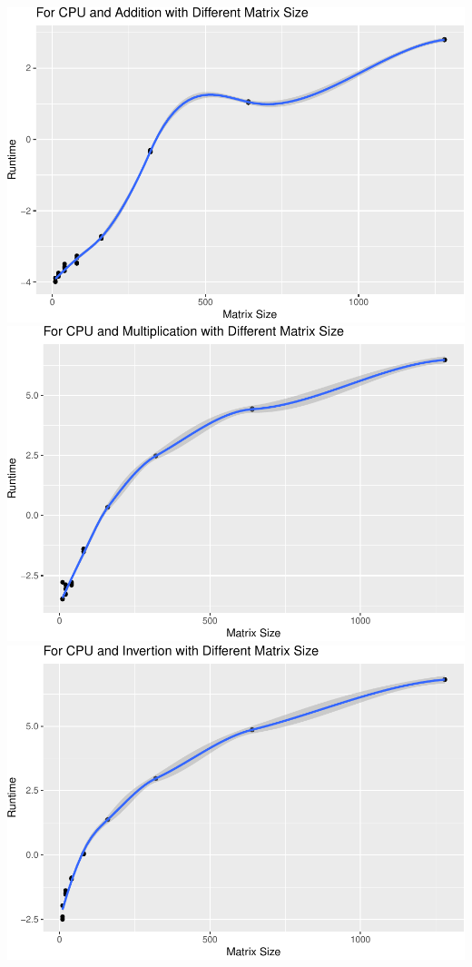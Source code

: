 \documentclass[
]{article}
\begin{document}
\includegraphics{main_files/figure-latex/unnamed-chunk-62-1.pdf}
\includegraphics{main_files/figure-latex/unnamed-chunk-62-2.pdf}
\includegraphics{main_files/figure-latex/unnamed-chunk-62-3.pdf}
\end{document}
